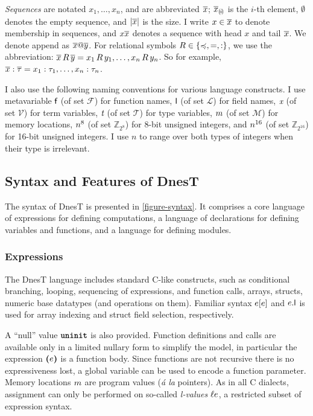 \emph{Sequences} are notated $x_1,\ldots,x_n$, and are abbreviated $\overline{x}$;
$\overline{x}_{(\mskip -2.5mu i\mskip -2.5mu)}$ is the $i$-th element, $\emptyset$ denotes the empty sequence, and
$|\overline{x}|$ is the size. I write $x \in \overline{x}$ to denote membership in sequences, and
$x\overline{x}$ denotes a sequence with head $x$ and tail $\overline{x}$. We denote append as
$\overline{x}@\overline{y}$. For relational symbols $R \in \{ \preccurlyeq, =, : \}$, we use the
abbreviation: $\overline{x}\, R\, \overline{y} = x_1\, R\, y_1, \ldots, x_n\, R\, y_n$. So for example,
$\overline{x} : \overline{\tau} = x_1 : \tau_1,\ldots,x_n : \tau_n$.

I also use the following naming conventions for various language constructs. I use metavariable
$\textsf{f}$ (of set $\mathcal{F}$) for function names, $\textsf{l}$ (of set $\mathcal{L}$) for field
names, $\textit{x}$ (of set $\mathcal{V}$) for term variables, $\textit{t}$ (of set $\mathcal{T}$) for type
variables, $ m$ (of set $\mathcal{M}$) for memory locations, $n^{8}$ (of set
$\mathbb{Z}_{2^8}$) for 8-bit unsigned integers, and $n^{16}$ (of set $\mathbb{Z}_{2^{16}}$)
for 16-bit unsigned integers. I use $n$ to range over both types of integers when their type is
irrelevant.

\subsection{Syntax and Features of DnesT}

The syntax of DnesT is presented in \autoref{figure-syntax}. It comprises a core language of
expressions for defining computations, a language of declarations for defining variables and
functions, and a language for defining modules.

\syntaxfig

\subsubsection{Expressions}

The DnesT language includes standard C-like constructs, such as conditional branching, looping,
sequencing of expressions, and function calls, arrays, structs, numeric base datatypes (and
operations on them). Familiar syntax $e [e]$ and $e.\textsf{l}$ is used for array indexing and
struct field selection, respectively.

A ``null'' value $\mbox{\bf \texttt{uninit}}$ is also provided. Function definitions and calls are available only
in a limited nullary form to simplify the model, in particular the expression $\textbf{(}e\textbf{)}$ is a
function body. Since functions are not recursive there is no expressiveness lost, a global
variable can be used to encode a function parameter. Memory locations $m$ are program
values (\emph{\'a la} pointers). As in all C dialects, assignment can only be performed on
so-called \emph{l-values} $\ell e$, a restricted subset of expression syntax.

